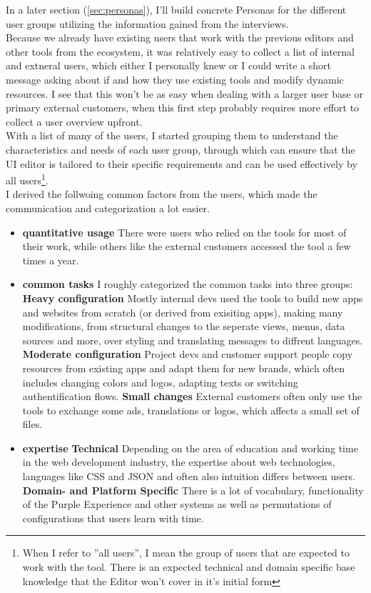 In a later section (\ref{sec:personas}), I'll build concrete Personas for the different user groups utilizing the information gained from the interviews.
\\
Because we already have existing users that work with the previous editors and other tools from the ecosystem, it was relatively easy to collect a list of internal and extneral users, which either I personally knew or I could write a short message asking about if and how they use existing tools and modify dynamic resources.
I see that this won't be as easy when dealing with a larger user base or primary external customers, when this first step probably requires more effort to collect a user overview upfront.
\\
With a list of many of the users, I started grouping them to understand the characteristics and needs of each user group, through which can ensure that the UI editor is tailored to their specific requirements and can be used effectively by all users\footnote{When I refer to ''all users'', I mean the group of users that are expected to work with the tool. There is an expected technical and domain specific base knowledge that the Editor won't cover in it's initial form}.
\\
I derived the follwoing common factors from the users, which made the communication and categorization a lot easier.

\begin{itemize}
  \item \textbf{quantitative usage} There were users who relied on the tools for most of their work, while others like the external customers accessed the tool a few times a year.
  \item \textbf{common tasks} I roughly categorized the common tasks into three groups:
    \subitem \textbf{Heavy configuration} Mostly internal devs used the tools to build new apps and websites from scratch (or derived from exisiting apps), making many modifications, from structural changes to the seperate views, menus, data sources and more, over styling and translating messages to diffrent languages.
    \subitem \textbf{Moderate configuration} Project devs and customer support people copy resources from existing apps and adapt them for new brands, which often includes changing colors and logos, adapting texts or switching authentification flows.
    \subitem \textbf{Small changes} External customers often only use the tools to exchange some ads, translations or logos, which affects a small set of files.
  \item \textbf{expertise} 
    \subitem \textbf{Technical} Depending on the area of education and working time in the web development industry, the expertise about web technologies, languages like CSS and JSON and often also intuition differs between users.
    \subitem \textbf{Domain- and Platform Specific} There is a lot of vocabulary, functionality of the Purple Experience and other systems as well as permutations of configurations that users learn with time.
\end{itemize}

